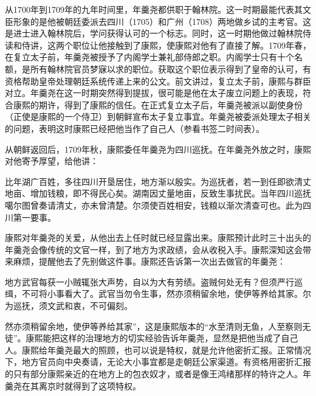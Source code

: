 
从1700年到1709年的九年时间里，年羹尧都供职于翰林院。这一时期最能代表其文臣形象的是他被朝廷委派去四川（1705）和广州（1708）两地做乡试的主考官。这是进士进入翰林院后，学问获得认可的一个标志。同时，这一时期他做过翰林院侍读和侍讲，这两个职位让他接触到了康熙，使康熙对他有了直接了解。1709年春，在复立太子前，年羹尧被授予了内阁学士兼礼部侍郎之职。内阁学士只有十个名额，是所有翰林院官员梦寐以求的职位。获取这个职位表示得到了皇帝的认可，有资格帮助皇帝处理朝廷系统传递上来的公文。前文讲过，复立太子前，康熙与群臣对立。年羹尧在这一时期突然得到提拔，很可能是他在太子废立问题上的表现，符合康熙的期许，得到了康熙的信任。在正式复立太子后，年羹尧被派以副使身份（正使是康熙的一个侍卫）到朝鲜宣布太子复立事宜。年羹尧被委派处理太子相关的问题，表明这时康熙已经把他当作了自己人（参看书签二时间表）。



从朝鲜返回后，1709年秋，康熙委任年羹尧为四川巡抚。在年羹尧外放之时，康熙对他寄予厚望，给他讲：



\begin{bookquote}比年湖广百姓，多往四川开垦居住，地方渐以殷实。为巡抚者，若一到任即欲清丈地亩、增加钱粮，即不得民心矣。湖南因丈量地亩，反致生事扰民。当年四川巡抚噶尔图曾奏请清丈，亦未曾清楚。尔须使百姓相安，钱粮以渐次清查可也。此为四川第一要事。\end{bookquote}


康熙对年羹尧的关爱，从他出去上任时就已经显露出来。康熙预计此时三十出头的年羹尧会像传统的文官一样，到了地方为求政绩，会从收税入手。康熙深知这会带来麻烦，提醒他去了先别做这件事。康熙还告诉第一次出去做官的年羹尧：



\begin{bookquote}地方武官每获一小贼辄张大声势，自以为大有劳绩。盗贼何处无有？但须严行巡缉，不可将小事看大了。武官当勿令生事，然亦须稍留余地，使伊等养给其家。尔为巡抚，须文武和衷，不可偏刻。\end{bookquote}


然亦须稍留余地，使伊等养给其家”，这是康熙版本的“水至清则无鱼，人至察则无徒”。康熙能把这样的治理地方的切实经验告诉年羹尧，显然是把他当成了自己人。康熙给年羹尧最大的照顾，也可以说是特权，就是允许他密折汇报。正常情况下，地方官员向中央奏请，无论大小事宜都是走朝廷公家渠道。有资格用密折汇报的只有部分康熙亲近的在地方上的包衣奴才，或者是像王鸿绪那样的特许之人。年羹尧在其离京时就得到了这项特权。


